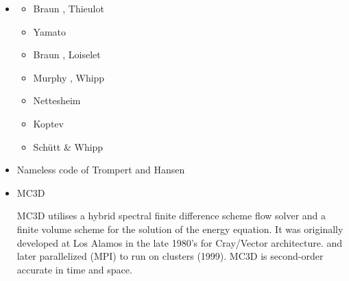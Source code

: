 \begin{itemize}
\item \douar {}

\begin{scriptsize}
\begin{itemize}
\item[\twothousandeight] Braun \etal  \cite{brtf08}, Thieulot \etal  \cite{thfb08}
\item[\twothousandnine] Yamato \etal  \cite{yahb09}
\item[\twothousandten] Braun \etal \cite{brya10}, Loiselet \etal \cite{lobh10}
\item[\twothousandfourteen] Murphy \etal \cite{mutg14}, Whipp \etal \cite{whbb14}
\item[\twothousandeighteen] Nettesheim \etal \cite{neew18}
\item[\twothousandnineteen] Koptev \etal \cite{koen19}
\item[\twothousandtwenty] Sch{\"u}tt \& Whipp \cite{scwh20}
\end{itemize}
\end{scriptsize} 

\item Nameless code of Trompert and Hansen

\begin{scriptsize}
\textcite{trha96}
\textcite{trha98}\textcite{trha98b}
\textcite{goch04}
\textcite{losh06}
\textcite{loha08}\textcite{stha08}
\textcite{stfh10}
\textcite{stlh13}
\textcite{stha13}
\textcite{stha14}
\end{scriptsize} 

\item MC3D 

MC3D utilises a hybrid spectral finite difference scheme flow
solver and a finite volume scheme for the solution of the energy equation.
It was originally developed at Los Alamos in the late 1980's for Cray/Vector architecture. 
and later parallelized (MPI) to run on clusters (1999).
MC3D is second-order accurate in time and space.


\end{itemize}
